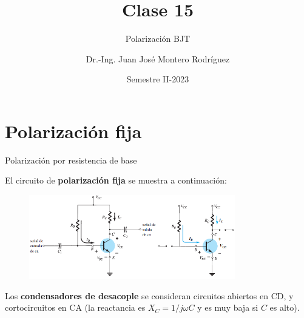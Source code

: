 \documentclass[t,aspectratio=169]{beamer}
\title{Clase 15}
\subtitle{Polarización BJT}
\author{Dr.-Ing. Juan José Montero Rodríguez}
\institute{Escuela de Ingeniería Electrónica}
\date{Semestre II-2023}
\begin{document}
\begin{frame}{}
\maketitle
\end{frame}

\section{Polarización fija}
\begin{frame}{Polarización por resistencia de base}

El circuito de \textbf{polarización fija} se muestra a continuación:

\begin{figure}
    \centering
    \includegraphics[width=0.8\textwidth]{figures/polarizacion_fija.png}
\end{figure}

Los \textbf{condensadores de desacople} se consideran circuitos abiertos en CD, y cortocircuitos en CA (la reactancia es $X_C = 1/j\omega{}C$ y es muy baja si $C$ es alto).

\end{frame}
\end{document}
